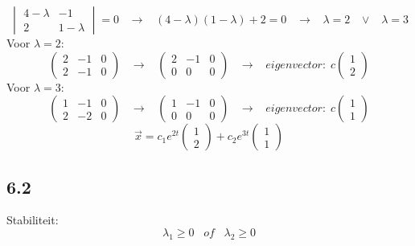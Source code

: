 \documentclass[11pt]{article}
\begin{document}
\[
\begin{vmatrix}
4-\lambda & -1 \\
2 & 1-\lambda
\end{vmatrix}
=0
\;\;\;\longrightarrow\;\;\;
(4-\lambda)(1-\lambda)+2=0
\;\;\;\longrightarrow\;\;\;
\lambda = 2 \;\;\;\vee\;\;\;\lambda = 3
\]
Voor $\lambda = 2$: 
\[
\left(
\begin{array}{cc|c}
2 & -1 & 0 \\
2 & -1 & 0
\end{array}
\right)
\;\;\;\longrightarrow\;\;\;
\left(
\begin{array}{cc|c}
2 & -1 & 0 \\
0 & 0 & 0
\end{array}
\right)
\;\;\;\longrightarrow\;\;\;
eigenvector:\;
c
\begin{pmatrix}
1\\2
\end{pmatrix}
\]
Voor $\lambda = 3$: 
\[
\left(
\begin{array}{cc|c}
1 & -1 & 0 \\
2 & -2 & 0
\end{array}
\right)
\;\;\;\longrightarrow\;\;\;
\left(
\begin{array}{cc|c}
1 & -1 & 0 \\
0 & 0 & 0
\end{array}
\right)
\;\;\;\longrightarrow\;\;\;
eigenvector:\;
c
\begin{pmatrix}
1\\1
\end{pmatrix}
\]
\[
\vec{x} = c_1e^{2t}\begin{pmatrix}
1\\2
\end{pmatrix}+c_2e^{3t}\begin{pmatrix}
1\\1
\end{pmatrix}
\]

\subsection*{6.2}
Stabiliteit:
\[
\lambda_1 \ge 0 \;\;\;of\;\;\; \lambda_2 \ge 0
\]
\end{document}
